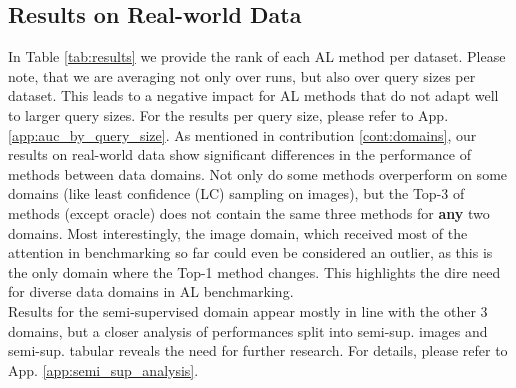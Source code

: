 \documentclass[]{article}
\begin{document}
\subsection{Results on Real-world Data}
In Table \ref{tab:results} we provide the rank of each AL method per dataset. 
Please note, that we are averaging not only over runs, but also over query sizes per dataset. 
This leads to a negative impact for AL methods that do not adapt well to larger query sizes.
For the results per query size, please refer to App. \ref{app:auc_by_query_size}. 
As mentioned in contribution \ref{cont:domains}, our results on real-world data show significant differences in the performance of methods between data domains.
Not only do some methods overperform on some domains (like least confidence (LC) sampling on images), but the Top-3 of methods (except oracle) does not contain the same three methods for \textbf{any} two domains.
Most interestingly, the image domain, which received most of the attention in benchmarking so far could even be considered an outlier, as this is the only domain where the Top-1 method changes.
This highlights the dire need for diverse data domains in AL benchmarking. \\
Results for the semi-supervised domain appear mostly in line with the other 3 domains, but a closer analysis of performances split into semi-sup. images and semi-sup. tabular reveals the need for further research.
For details, please refer to App. \ref{app:semi_sup_analysis}.
\end{document}
